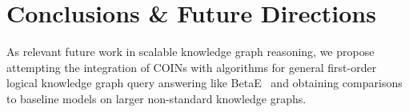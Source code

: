 \chapter{Conclusions \& Future Directions}
\label{chp: conclusion}


As relevant future work in scalable knowledge graph reasoning, we propose attempting the integration of COINs with algorithms for general first-order logical knowledge graph query answering like BetaE~\cite{ren_beta_2020} and obtaining comparisons to baseline models on larger non-standard knowledge graphs.